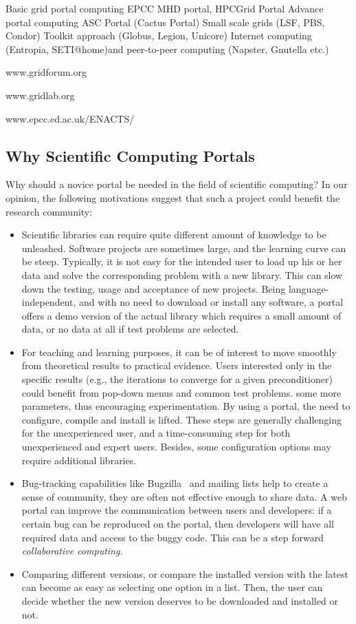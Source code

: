 \documentclass[11pt,relax]{SANDreport}
\begin{document}
Basic grid portal computing 
EPCC MHD portal, HPCGrid Portal 
Advance portal computing 
ASC Portal (Cactus Portal) 
Small scale grids (LSF, PBS, Condor) 
Toolkit approach (Globus, Legion, Unicore) 
Internet computing (Entropia, SETI@home)and peer-to-peer computing (Napster, Gnutella etc.)


www.gridforum.org

www.gridlab.org 

www.epcc.ed.ac.uk/ENACTS/

\subsection{Why Scientific Computing Portals}

Why should a novice portal be needed in the field of scientific computing? In
our opinion, the following motivations suggest that such a project could
benefit the research community:
\begin{itemize}
\setlength{\itemsep}{0pt}
\item Scientific libraries can require quite different amount
of knowledge to be unleashed. Software projects are sometimes large, and the
learning curve can be steep. Typically, it is not easy for the intended user
to load up his or her data and solve the corresponding problem with a new
library. This can slow down the testing, usage and acceptance of new 
projects. Being language-independent, and with no need to download or install
any software, a portal offers a demo version of the actual library which
requires a small amount of data, or no data at all if test problems are
selected.
%
\item For teaching and learning purposes, it can be of interest to move
smoothly from theoretical results to practical evidence.
Users interested only in the specific results 
(e.g., the iterations to converge for a given preconditioner) could benefit
from pop-down menus and common test problems.
some more parameters, thus encouraging experimentation. By using a portal,
the need to configure, compile and install is lifted. These steps are
generally challenging  for
the unexperienced user, and a time-consuming step for both unexperienced and
expert users. Besides, some configuration options may require additional
libraries.
%
\item Bug-tracking capabilities like Bugzilla~\cite{bugzilla} and
mailing lists help to create a sense of community, they are often not
effective enough to share data. A web portal can improve the communication
between users and developers: if a certain bug can be reproduced on the
portal, then developers will have all required data and access to the buggy
code. This can be a step forward {\sl collaborative computing}.
\item Comparing different versions, or compare the installed version with the
latest can become as easy as selecting one option in a list. Then, the user
can decide whether the new version deserves to be downloaded and installed or
not.
\end{itemize}
\end{document}
